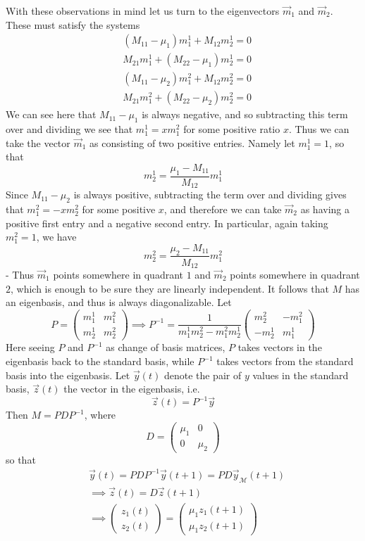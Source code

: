 With these observations in mind let us turn to the eigenvectors $\vec{m}_1$ and $\vec{m}_2$. These must satisfy the systems
\begin{align}
	& (M_{11} - \mu_1)m^1_1 + M_{12}m^1_2 = 0  \label{e11}\\
	& M_{21}m^1_1 + (M_{22} - \mu_1)m^1_2 = 0 \label{e12}
\end{align}
\begin{align}
	& (M_{11} - \mu_2)m^2_1 + M_{12}m^2_2 = 0  \label{e21}\\
	& M_{21}m^2_1 + (M_{22} - \mu_2)m^2_2 = 0 \label{e22}
\end{align}
We can see here that $M_{11} - \mu_1$ is always negative, and so subtracting this term over and dividing we see that $m^1_1 = xm^2_1$ for some positive ratio $x$. Thus we can take the vector $\vec{m}_1$ as consisting of two positive entries. Namely let $m^1_1 = 1$, so that 
\[ m_2^1 = \frac{\mu_1-M_{11}}{M_{12}}m^1_1 \]
 Since $M_{11} - \mu_2$ is always positive, subtracting the term over and dividing gives that $m^2_1 = -xm^2_2$ for some positive $x$, and therefore we can take $\vec{m}_2$ as having a positive first entry and a negative second entry. In particular, again taking $m^2_1 = 1$, we have
\[ m^2_2 = \frac{\mu_2-M_{11}}{M_{12}}m^2_1 \]-  
  Thus $\vec{m}_1$ points somewhere in quadrant $1$ and $\vec{m}_2$ points somewhere in quadrant $2$, which is enough to be sure they are linearly independent. It follows that $M$ has an eigenbasis, and thus is always diagonalizable. Let 
  \[ P = \begin{pmatrix} m^1_1 & m^2_1 \\ m^1_2 & m^2_2 \end{pmatrix} \implies P^{-1} = \frac{1}{m^1_1m^2_2-m^2_1m^1_2} \begin{pmatrix} m^2_2 & -m^2_1 \\ -m^1_2 & m^1_1 \end{pmatrix} \]
Here seeing $P$ and $P^{-1}$ as change of basis matrices, $P$ takes vectors in the eigenbasis back to the standard basis, while $P^{-1}$ takes vectors from the standard basis into the eigenbasis. Let $\vec{y}(t)$ denote the pair of $y$ values in the standard basis, $\vec{z}(t)$ the vector in the eigenbasis, i.e. 
\[ \vec{z}(t) = P^{-1}\vec{y} \]
Then $M = PDP^{-1}$, where 
\[ D = \begin{pmatrix} \mu_1 & 0 \\ 0 & \mu_2 \end{pmatrix} \] so that
\begin{align}
	& \vec{y}(t) = PDP^{-1}\vec{y}(t+1) = PD\vec{y}_{\mathcal{M}}(t+1) \\
	&\implies \vec{z}(t) = D\vec{z}(t+1) \\
	&\implies \begin{pmatrix} z_1(t) \\ z_2(t) \end{pmatrix} = \begin{pmatrix} \mu_1z_1(t+1) \\ \mu_1z_2(t+1) \end{pmatrix}
\end{align}
